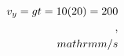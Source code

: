 \documentclass[preview]{standalone}
\begin{document}
\begin{align*}
\special{dvisvgm:raw <g id='unique000'>}v_y = g t = 10(20) = 200\\,\\mathrm{m/s}\special{dvisvgm:raw </g>}
\end{align*}
\end{document}
